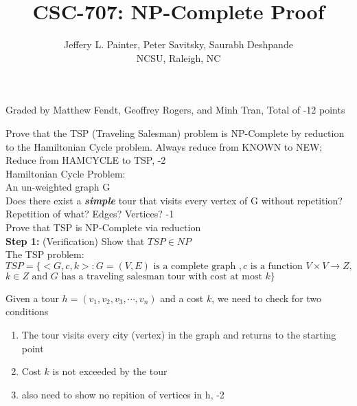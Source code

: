 \documentclass{article}
\newcommand{\add}[1]{\textcolor{dkgreen}{#1}}
\begin{document}
\date{}

\title{\Large\bf CSC-707: NP-Complete Proof}

\author{Jeffery L. Painter, Peter Savitsky, Saurabh Deshpande\\
NCSU, Raleigh, NC}

\maketitle
\thispagestyle{empty}

\add{Graded by Matthew Fendt, Geoffrey Rogers, and Minh Tran, Total of -12 points}

  Prove that the TSP (Traveling Salesman) problem is NP-Complete 
  by reduction to the Hamiltonian Cycle problem. \add{Always reduce from KNOWN to NEW; Reduce from HAMCYCLE to TSP, -2}\\

  Hamiltonian Cycle Problem: \\
   An un-weighted graph G \\
   Does there exist a {\em{\bf simple}} tour 
                       that visits every vertex of G without repetition?\add{ Repetition of what?  Edges?  Vertices? -1} \\
 
  Prove that TSP is NP-Complete via reduction \\

  {\bf Step 1:} (Verification) Show that $TSP \in NP$ \\

      \indent The TSP problem: 
      $TSP = \{ <G, c, k> : G = (V, E) \text{ is a complete graph }, c \text{ is a function } V \times V \rightarrow Z, $ \\
      \indent $k \in Z \text{ and } G \text{ has a traveling salesman tour with cost at most } k \}$

    Given a tour $h = (v_1, v_2, v_3, \cdots, v_n )$ and a cost $k$, we need to check for two conditions
    \begin{enumerate}
      \item The tour visits every city (vertex) in the graph and returns to the starting point
      \item Cost $k$ is not exceeded by the tour
      \item \add{also need to show no repition of vertices in h, -2}
    \end{enumerate}
\end{document}
